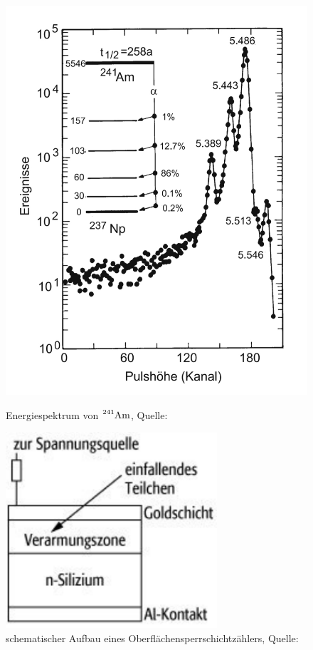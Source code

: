 \documentclass[12pt,a4paper]{scrartcl}
\numberwithin{equation}{section} %
\renewcommand{\[}{} %
\renewcommand{\]}{\noindent} %
\begin{document}
\begin{figure}[h!]
	\centering
	
	\begin{minipage}{0.45\textwidth}
		\centering
		\includegraphics[width=\textwidth]{../media/B3.3/Am241_Spektrum.jpg}
		\caption{Energiespektrum von $\ce{^241Am}$, Quelle: \cite{Bethge}}
		\label{abb:Spektrum}
	\end{minipage}
	\begin{minipage}{0.45\textwidth}
		\centering
		\includegraphics[width=0.7\textwidth]{../media/B3.3/Oberflaechensperrschichtzaehler.pdf}
		\caption{schematischer Aufbau eines Oberflächensperrschichtzählers,
			Quelle: \cite{Spektrum]}}
		\label{abb:Oberflächensperrschichtzähler}
		\vspace{1cm}
		

\end{minipage}
\end{figure}
\end{document}
